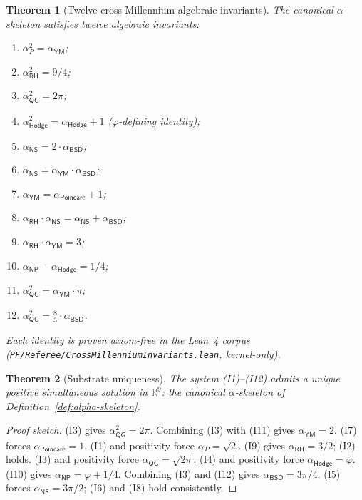 \documentclass[11pt,a4paper]{amsart}
\theoremstyle{plain}
\newtheorem{theorem}{Theorem}[section]
\theoremstyle{definition}
\begin{document}
\begin{theorem}[Twelve cross-Millennium algebraic invariants]\label{thm:invariants}
The canonical $\alpha$-skeleton satisfies twelve algebraic invariants:
\begin{enumerate}[label=\textup{(I\arabic*)},itemsep=2pt,leftmargin=2.5em]
\item $\alpha_{P}^{2} = \alpha_{\textsf{YM}}$;
\item $\alpha_{\textsf{RH}}^{2} = 9/4$;
\item $\alpha_{\textsf{QG}}^{2} = 2\pi$;
\item $\alpha_{\textsf{Hodge}}^{2} = \alpha_{\textsf{Hodge}} + 1$ ($\varphi$-defining identity);
\item $\alpha_{\textsf{NS}} = 2 \cdot \alpha_{\textsf{BSD}}$;
\item $\alpha_{\textsf{NS}} = \alpha_{\textsf{YM}} \cdot \alpha_{\textsf{BSD}}$;
\item $\alpha_{\textsf{YM}} = \alpha_{\textsf{Poincar\'e}} + 1$;
\item $\alpha_{\textsf{RH}} \cdot \alpha_{\textsf{NS}} = \alpha_{\textsf{NS}} + \alpha_{\textsf{BSD}}$;
\item $\alpha_{\textsf{RH}} \cdot \alpha_{\textsf{YM}} = 3$;
\item $\alpha_{\textsf{NP}} - \alpha_{\textsf{Hodge}} = 1/4$;
\item $\alpha_{\textsf{QG}}^{2} = \alpha_{\textsf{YM}} \cdot \pi$;
\item $\alpha_{\textsf{QG}}^{2} = \tfrac{8}{3} \cdot \alpha_{\textsf{BSD}}$.
\end{enumerate}
Each identity is proven axiom-free in the Lean~4 corpus (\texttt{PF/Referee/CrossMillenniumInvariants.lean}, kernel-only).
\end{theorem}

\begin{theorem}[Substrate uniqueness]\label{thm:alpha-unique}
The system \textup{(I1)--(I12)} admits a unique positive simultaneous solution in $\mathbb{R}^{9}$: the canonical $\alpha$-skeleton of Definition~\ref{def:alpha-skeleton}.
\end{theorem}

\begin{proof}[Proof sketch]
(I3) gives $\alpha_{\textsf{QG}}^{2} = 2\pi$. Combining (I3) with (I11) gives $\alpha_{\textsf{YM}} = 2$. (I7) forces $\alpha_{\textsf{Poincar\'e}} = 1$. (I1) and positivity force $\alpha_{P} = \sqrt{2}$. (I9) gives $\alpha_{\textsf{RH}} = 3/2$; (I2) holds. (I3) and positivity force $\alpha_{\textsf{QG}} = \sqrt{2\pi}$. (I4) and positivity force $\alpha_{\textsf{Hodge}} = \varphi$. (I10) gives $\alpha_{\textsf{NP}} = \varphi + 1/4$. Combining (I3) and (I12) gives $\alpha_{\textsf{BSD}} = 3\pi/4$. (I5) forces $\alpha_{\textsf{NS}} = 3\pi/2$; (I6) and (I8) hold consistently.
\end{proof}
\end{document}
